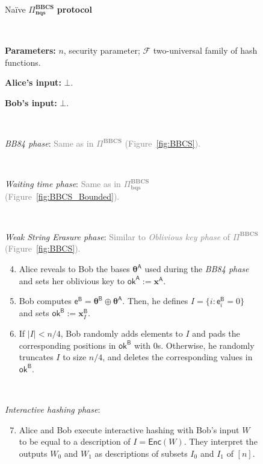\begin{figure}[h!]
\centering
\begin{tcolorbox}
                        
    \centerline{Na\"ive $\Pi^{\textbf{BBCS}}_{\textbf{nqs}}$ \textbf{protocol}}
            
    \
    
    \textbf{Parameters:} $n$, security parameter; $\mathcal{F}$ two-universal family of hash functions.
    
    \textbf{Alice's input:} $\bot$.  
    
    \textbf{Bob's input:} $\bot$. 
    
    \
    
    \textit{BB84 phase}: \textcolor{gray}{Same as in $\Pi^{\textbf{BBCS}}$ (Figure~\ref{fig:BBCS}).}
    
    
    \
    
    \textit{Waiting time phase}: \textcolor{gray}{Same as in $\Pi^{\textbf{BBCS}}_{\textbf{bqs}}$ (Figure~\ref{fig:BBCS_Bounded}).}
    
    \
    
    \textit{Weak String Erasure phase}: \textcolor{gray}{Similar to \textit{Oblivious key phase} of $\Pi^{\textbf{BBCS}}$ (Figure~\ref{fig:BBCS}).}
    \begin{enumerate}
        \setcounter{enumi}{3}
        \item Alice reveals to Bob the bases $\bm{\theta}^{\mathsf{A}}$ used during the \textit{BB84 phase} and sets her oblivious key to $\mathsf{ok}^{\mathsf{A}}:=\bm{x}^{\mathsf{A}}$.
        
        \item Bob computes $\mathsf{e}^\mathsf{B} = \bm{\theta}^{\mathsf{B}} \oplus \bm{\theta}^{\mathsf{A}}$. Then, he defines $I = \{ i : \mathsf{e}^{\mathsf{B}}_i = 0 \}$ and sets $\mathsf{ok}^{\mathsf{B}}:=\bm{x}^{\mathsf{B}}_{I}$.
        
        \item If $|I| < n/4$, Bob randomly adds elements to $I$ and pads the corresponding positions in $\mathsf{ok}^{\mathsf{B}}$ with $0$s. Otherwise, he randomly truncates $I$ to size $n/4$, and deletes the corresponding values in $\mathsf{ok}^{\mathsf{B}}$.
    \end{enumerate}
     
    \ 
     
    \textit{Interactive hashing phase}: 
    \begin{enumerate}
        \setcounter{enumi}{6}
        \item Alice and Bob execute interactive hashing with Bob’s input $W$ to be equal to a description of $I = \mathsf{Enc}(W)$. They interpret the outputs $W_0$ and $W_1$ as descriptions of subsets $I_0$ and $I_1$ of $[n]$.
    \end{enumerate}
    

\end{tcolorbox}
\end{figure}
